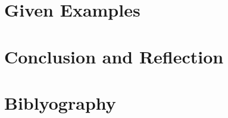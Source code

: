 \documentclass[a4paper]{article}
\numberwithin{equation}{subsection}
\begin{document}
\section{Given Examples}

\section{Conclusion and Reflection}
\newpage

\section*{Biblyography}
\end{document}
